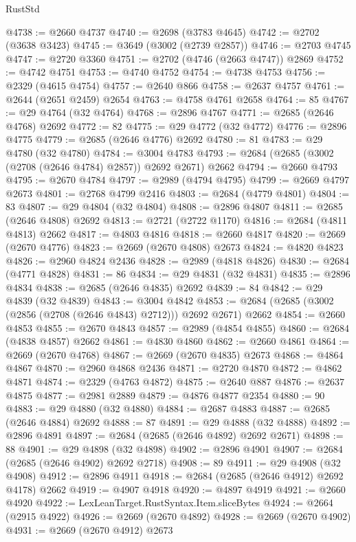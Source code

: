 \begin{lexlean}{RustStd}
\begin{coremodule}
@4738 := @2660 @4737
@4740 := @2698 (@3783 @4645)
@4742 := @2702 (@3638 @3423)
@4745 := @3649 (@3002 (@2739 @2857))
@4746 := @2703 @4745
@4747 := @2720 @3360
@4751 := @2702 (@4746 (@2663 @4747)) @2869
@4752 := @4742 @4751
@4753 := @4740 @4752
@4754 := @4738 @4753
@4756 := @2329 (@4615 @4754)
@4757 := @2640 @866
@4758 := @2637 @4757
@4761 := @2644 (@2651 @2459) @2654
@4763 := @4758 @4761 @2658
@4764 := 85
@4767 := @29 @4764 (@32 @4764)
@4768 := @2896 @4767
@4771 := @2685 (@2646 @4768) @2692
@4772 := 82
@4775 := @29 @4772 (@32 @4772)
@4776 := @2896 @4775
@4779 := @2685 (@2646 @4776) @2692
@4780 := 81
@4783 := @29 @4780 (@32 @4780)
@4784 := @3004 @4783
@4793 := @2684 (@2685 (@3002 (@2708 (@2646 @4784) @2857)) @2692 @2671) @2662
@4794 := @2660 @4793
@4795 := @2670 @4784
@4797 := @2989 (@4794 @4795)
@4799 := @2669 @4797 @2673
@4801 := @2768 @4799 @2416
@4803 := @2684 (@4779 @4801)
@4804 := 83
@4807 := @29 @4804 (@32 @4804)
@4808 := @2896 @4807
@4811 := @2685 (@2646 @4808) @2692
@4813 := @2721 (@2722 @1170)
@4816 := @2684 (@4811 @4813) @2662
@4817 := @4803 @4816
@4818 := @2660 @4817
@4820 := @2669 (@2670 @4776)
@4823 := @2669 (@2670 @4808) @2673
@4824 := @4820 @4823
@4826 := @2960 @4824 @2436
@4828 := @2989 (@4818 @4826)
@4830 := @2684 (@4771 @4828)
@4831 := 86
@4834 := @29 @4831 (@32 @4831)
@4835 := @2896 @4834
@4838 := @2685 (@2646 @4835) @2692
@4839 := 84
@4842 := @29 @4839 (@32 @4839)
@4843 := @3004 @4842
@4853 := @2684 (@2685 (@3002 (@2856 (@2708 (@2646 @4843) @2712))) @2692 @2671) @2662
@4854 := @2660 @4853
@4855 := @2670 @4843
@4857 := @2989 (@4854 @4855)
@4860 := @2684 (@4838 @4857) @2662
@4861 := @4830 @4860
@4862 := @2660 @4861
@4864 := @2669 (@2670 @4768)
@4867 := @2669 (@2670 @4835) @2673
@4868 := @4864 @4867
@4870 := @2960 @4868 @2436
@4871 := @2720 @4870
@4872 := @4862 @4871
@4874 := @2329 (@4763 @4872)
@4875 := @2640 @887
@4876 := @2637 @4875
@4877 := @2981 @2889
@4879 := @4876 @4877 @2354
@4880 := 90
@4883 := @29 @4880 (@32 @4880)
@4884 := @2687 @4883
@4887 := @2685 (@2646 @4884) @2692
@4888 := 87
@4891 := @29 @4888 (@32 @4888)
@4892 := @2896 @4891
@4897 := @2684 (@2685 (@2646 @4892) @2692 @2671)
@4898 := 88
@4901 := @29 @4898 (@32 @4898)
@4902 := @2896 @4901
@4907 := @2684 (@2685 (@2646 @4902) @2692 @2718)
@4908 := 89
@4911 := @29 @4908 (@32 @4908)
@4912 := @2896 @4911
@4918 := @2684 (@2685 (@2646 @4912) @2692 @4178) @2662
@4919 := @4907 @4918
@4920 := @4897 @4919
@4921 := @2660 @4920
@4922 := LexLeanTarget.RustSyntax.Item.sliceBytes
@4924 := @2664 (@2915 @4922)
@4926 := @2669 (@2670 @4892)
@4928 := @2669 (@2670 @4902)
@4931 := @2669 (@2670 @4912) @2673

\end{coremodule}
\end{lexlean}
